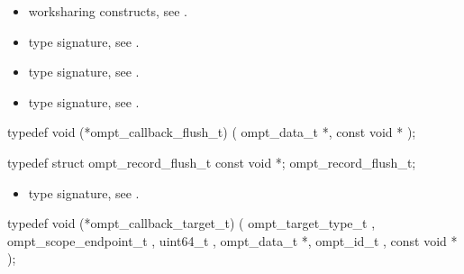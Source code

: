 \codeptrdesc


\crossreferences
\begin{itemize}
\item worksharing constructs, see .
\item {} type signature, see
.
\item {} type signature, see
.
\item {} type signature, see
.
\end{itemize}



\label{sec:ompt_callback_flush_t}
\format

\begin{ccppspecific}
\begin{omptCallback}
typedef void (*ompt_callback_flush_t) (
  ompt_data_t *,
  const void *
);
\end{omptCallback}
\end{ccppspecific}


\record

\begin{ccppspecific}
\begin{omptRecord}
typedef struct ompt_record_flush_t {
  const void *;
} ompt_record_flush_t;
\end{omptRecord}
\end{ccppspecific}


\argdesc

\codeptrdesc

\crossreferences
\begin{itemize}
\item {} type signature, see
.
\end{itemize}



\label{sec:ompt_callback_target_t}
\format

\begin{ccppspecific}
\begin{omptCallback}
typedef void (*ompt_callback_target_t) (
  ompt_target_type_t ,
  ompt_scope_endpoint_t ,
  uint64_t ,
  ompt_data_t *,
  ompt_id_t ,
  const void *
);
\end{omptCallback}
\end{ccppspecific}


